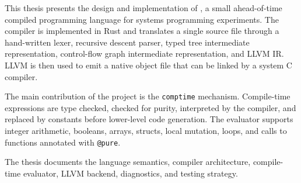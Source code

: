 \noindent This thesis presents the design and implementation of \epl, a small
ahead-of-time compiled programming language for systems programming experiments.
The compiler is implemented in Rust and translates a single \epl{} source file
through a hand-written lexer, recursive descent parser, typed tree intermediate
representation, control-flow graph intermediate representation, and LLVM IR.
LLVM is then used to emit a native object file that can be linked by a system C
compiler.

\noindent The main contribution of the project is the \texttt{comptime}
mechanism. Compile-time expressions are type checked, checked for purity,
interpreted by the compiler, and replaced by constants before lower-level code
generation. The evaluator supports integer arithmetic, booleans, arrays,
structs, local mutation, loops, and calls to functions annotated with
\texttt{@pure}.

\noindent The thesis documents the language semantics, compiler architecture,
compile-time evaluator, LLVM backend, diagnostics, and testing strategy.
